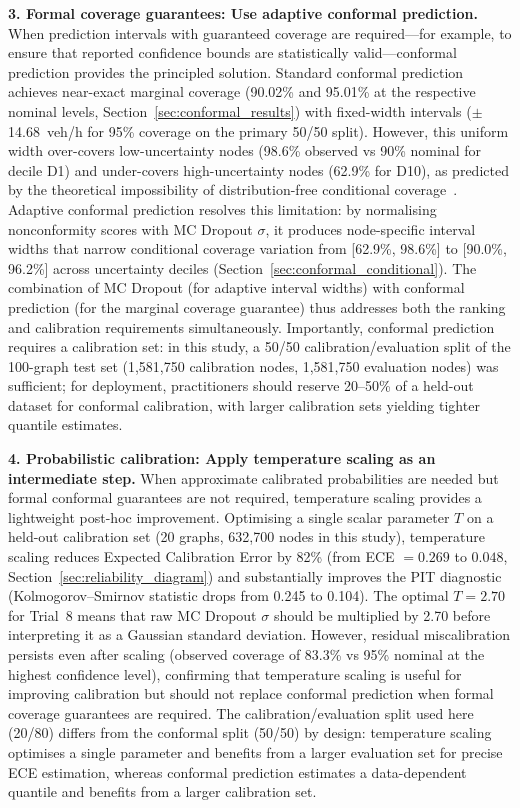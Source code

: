 \textbf{3. Formal coverage guarantees: Use adaptive conformal prediction.} When prediction intervals with guaranteed coverage are required---for example, to ensure that reported confidence bounds are statistically valid---conformal prediction provides the principled solution. Standard conformal prediction achieves near-exact marginal coverage (90.02\% and 95.01\% at the respective nominal levels, Section~\ref{sec:conformal_results}) with fixed-width intervals ($\pm$14.68~veh/h for 95\% coverage on the primary 50/50 split). However, this uniform width over-covers low-uncertainty nodes (98.6\% observed vs 90\% nominal for decile D1) and under-covers high-uncertainty nodes (62.9\% for D10), as predicted by the theoretical impossibility of distribution-free conditional coverage~\cite{barber2021limits}. Adaptive conformal prediction resolves this limitation: by normalising nonconformity scores with MC Dropout $\sigma$, it produces node-specific interval widths that narrow conditional coverage variation from [62.9\%, 98.6\%] to [90.0\%, 96.2\%] across uncertainty deciles (Section~\ref{sec:conformal_conditional}). The combination of MC Dropout (for adaptive interval widths) with conformal prediction (for the marginal coverage guarantee) thus addresses both the ranking and calibration requirements simultaneously. Importantly, conformal prediction requires a calibration set: in this study, a 50/50 calibration/evaluation split of the 100-graph test set (1,581,750 calibration nodes, 1,581,750 evaluation nodes) was sufficient; for deployment, practitioners should reserve 20--50\% of a held-out dataset for conformal calibration, with larger calibration sets yielding tighter quantile estimates.

\textbf{4. Probabilistic calibration: Apply temperature scaling as an intermediate step.} When approximate calibrated probabilities are needed but formal conformal guarantees are not required, temperature scaling provides a lightweight post-hoc improvement. Optimising a single scalar parameter $T$ on a held-out calibration set (20 graphs, 632,700 nodes in this study), temperature scaling reduces Expected Calibration Error by 82\% (from ECE $= 0.269$ to $0.048$, Section~\ref{sec:reliability_diagram}) and substantially improves the PIT diagnostic (Kolmogorov--Smirnov statistic drops from 0.245 to 0.104). The optimal $T = 2.70$ for Trial~8 means that raw MC Dropout $\sigma$ should be multiplied by 2.70 before interpreting it as a Gaussian standard deviation. However, residual miscalibration persists even after scaling (observed coverage of 83.3\% vs 95\% nominal at the highest confidence level), confirming that temperature scaling is useful for improving calibration but should not replace conformal prediction when formal coverage guarantees are required. The calibration/evaluation split used here (20/80) differs from the conformal split (50/50) by design: temperature scaling optimises a single parameter and benefits from a larger evaluation set for precise ECE estimation, whereas conformal prediction estimates a data-dependent quantile and benefits from a larger calibration set.

